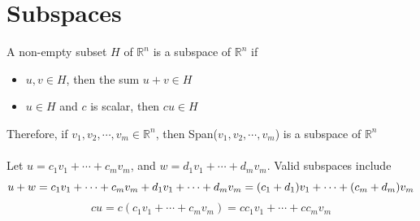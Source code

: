 \section{Subspaces}
A non-empty subset $H$ of $\mathbb{R}^n$ is a subspace of $\mathbb{R}^n$ if 
\begin{itemize}
  \item $u, v \in H$, then the sum $u + v \in H$
  \item $u \in H$ and $c$ is scalar, then $cu \in H$
\end{itemize}
Therefore, if $v_1, v_2, \cdots, v_m \in \mathbb{R}^n$, then Span($v_1, v_2, \cdots, v_m$) is 
a subspace of $\mathbb{R}^n$ \\\\
Let $u = c_1v_1 + \cdots + c_mv_m$, and $w = d_1v_1 + \cdots + d_mv_m$. Valid subspaces 
include
\[
  u + w = c_1v_1 + \cdots + c_mv_m + d_1v_1 + \cdots + d_mv_m 
  = (c_1 + d_1)v_1 + \cdots + (c_m + d_m)v_m \\
\]
\[
  cu = c(c_1v_1 + \cdots + c_mv_m) = cc_1v_1 + \cdots + cc_mv_m
\]
